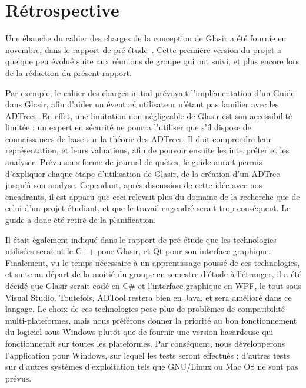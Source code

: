 \section{Rétrospective}
    \label{sec:retro}

    Une ébauche du cahier des charges de la conception de Glasir a été fournie en novembre, dans le rapport de pré-étude~\cite{pre_etude}. Cette première version du projet a quelque peu évolué suite aux réunions de groupe qui ont suivi, et plus encore lors de la rédaction du présent rapport.

    Par exemple, le cahier des charges initial prévoyait l'implémentation d'un \og Guide \fg{} dans Glasir, afin d'aider un éventuel utilisateur n'étant pas familier avec les ADTrees. En effet, une limitation non-négligeable de Glasir est son accessibilité limitée : un expert en sécurité ne pourra l'utiliser que s'il dispose de connaissances de base sur la théorie des ADTrees. Il doit comprendre leur représentation, et leurs valuations, afin de pouvoir ensuite les interpréter et les analyser. Prévu sous forme de journal de quêtes, le guide aurait permis d'expliquer chaque étape d'utilisation de Glasir, de la création d'un ADTree jusqu'à son analyse. Cependant, après discussion de cette idée avec nos encadrants, il est apparu que ceci relevait plus du domaine de la recherche que de celui d'un projet étudiant, et que le travail engendré serait trop conséquent. Le guide a donc été retiré de la planification.

    Il était également indiqué dans le rapport de pré-étude que les technologies utilisées seraient le C++ pour Glasir, et Qt pour son interface graphique. Finalement, vu le temps nécessaire à un apprentissage poussé de ces technologies, et suite au départ de la moitié du groupe en semestre d'étude à l'étranger, il a été décidé que Glasir serait codé en C\# et l'interface graphique en WPF, le tout sous Visual Studio. Toutefois, ADTool restera bien en Java, et sera amélioré dans ce langage. Le choix de ces technologies pose plus de problèmes de compatibilité multi-plateformes, mais nous préférons donner la priorité au bon fonctionnement du logiciel sous Windows plutôt que de fournir une version hasardeuse qui fonctionnerait sur toutes les plateformes. Par conséquent, nous développerons l'application pour Windows, sur lequel les tests seront effectués ; d'autres tests sur d'autres systèmes d'exploitation tels que GNU/Linux ou Mac OS ne sont pas prévus.
